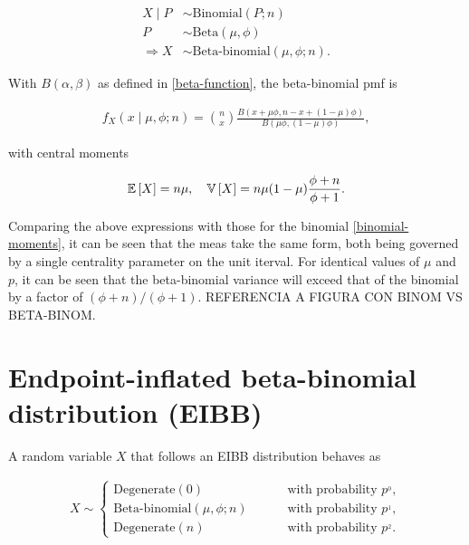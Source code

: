 \begin{equation}
\begin{split}
X \mid P &\sim \text{Binomial}(P; n)\\
P &\sim \text{Beta}(\mu, \phi)\\
\Rightarrow X &\sim \text{Beta-binomial}(\mu, \phi; n).
\end{split}
\end{equation}

With $B(\alpha,\beta)$ as defined in \ref{beta-function}, the beta-binomial pmf is

\begin{equation}
\begin{split}
f_X(x \mid \mu, \phi; n) = \binom{n}{x}\frac{B(x+\mu\phi, n - x + (1-\mu)\phi)}{B(\mu\phi, (1-\mu)\phi)},
\end{split}
\label{betabinomial-pmf}
\end{equation}

with central moments

\begin{equation}
\begin{split}
{\mathbb E}\left[ X \right] = n\mu, \quad {\mathbb V}\left[ X \right] = n\mu(1-\mu)\frac{\phi+n}{\phi+1}.
\end{split}
\end{equation}

Comparing the above expressions with those for the binomial \ref{binomial-moments}, it can be seen that the meas take the same form, both being governed by a single centrality parameter on the unit iterval. For identical values of $\mu$ and $p$, it can be seen that the beta-binomial variance will exceed that of the binomial by a factor of $(\phi+n)/(\phi+1)$. REFERENCIA A FIGURA CON BINOM VS BETA-BINOM.

\section{Endpoint-inflated beta-binomial distribution (EIBB)}
\label{sec:eibb-dist}

A random variable $X$ that follows an EIBB distribution behaves as

\begin{equation}
\begin{split}
X \sim
\begin{cases}
\text{Degenerate}(0) \qquad &\text{ with probability } p^{_0},\\
\text{Beta-binomial}(\mu, \phi; n) \qquad &\text{ with probability } p^{_1},\\
\text{Degenerate}(n) \qquad &\text{ with probability } p^{_2}.
\end{cases}
\end{split}
\end{equation}


